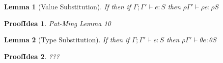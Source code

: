 \documentclass[10pt,a4paper]{article}
\newtheorem{lemma}{Lemma}
\newtheorem*{proofIdea}{ProofIdea}
\newcommand\hastype[3]{\ensuremath{#1 \vdash #2 : #3}}
\begin{document}
\begin{lemma}[Value Substitution]
\label{LemValueSub}
If \isWellFormed{\Gamma}{\rho} 
then if \hastype{\Gamma; \Gamma'}{e}{S}
then \hastype{\rho\Gamma'}{\rho e}{\rho S}
\end{lemma}
\begin{proofIdea}
Pat-Ming Lemma 10
\end{proofIdea}

\begin{lemma}[Type Substitution]
\label{LemTypeSub}
If \isWellFormed{\Gamma}{\theta} 
then if \hastype{\Gamma; \Gamma'}{e}{S}
then \hastype{\rho\Gamma'}{\theta e}{\theta S}
\end{lemma}
\begin{proofIdea}
???
\end{proofIdea}






\end{document}
